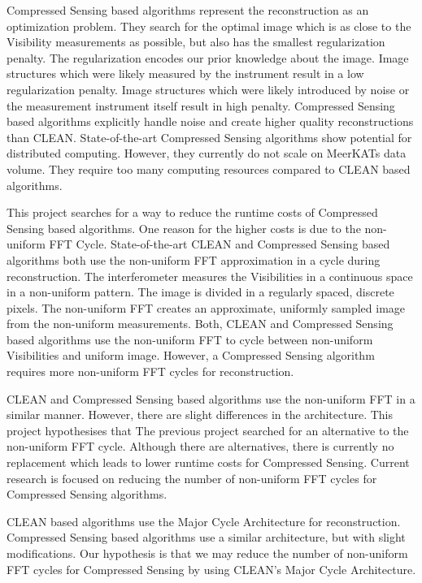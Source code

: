 Compressed Sensing based algorithms represent the reconstruction as an optimization problem. They search for the optimal image which is as close to the Visibility measurements as possible, but also has the smallest regularization penalty. The regularization encodes our prior knowledge about the image. Image structures which were likely measured by the instrument result in a low regularization penalty. Image structures which were likely introduced by noise or the measurement instrument itself result in high penalty. Compressed Sensing based algorithms explicitly handle noise and create higher quality reconstructions than CLEAN. State-of-the-art Compressed Sensing algorithms show potential for distributed computing. However, they currently do not scale on MeerKATs data volume. They require too many computing resources compared to CLEAN based algorithms.
 
This project searches for a way to reduce the runtime costs of Compressed Sensing based algorithms. One reason for the higher costs is due to the non-uniform FFT Cycle. State-of-the-art CLEAN and Compressed Sensing based algorithms both use the non-uniform FFT approximation in a cycle during reconstruction. The interferometer measures the Visibilities in a continuous space in a non-uniform pattern. The image is divided in a regularly spaced, discrete pixels. The non-uniform FFT creates an approximate, uniformly sampled image from the non-uniform measurements. Both, CLEAN and Compressed Sensing based algorithms use the non-uniform FFT to cycle between non-uniform Visibilities and uniform image. However, a Compressed Sensing algorithm requires more non-uniform FFT cycles for reconstruction. 

CLEAN and Compressed Sensing based algorithms use the non-uniform FFT in a similar manner. However, there are slight differences in the architecture. This project hypothesises that 
The previous project searched for an alternative to the non-uniform FFT cycle. Although there are alternatives, there is currently no replacement which leads to lower runtime costs for Compressed Sensing. Current research is focused on reducing the number of non-uniform FFT cycles for Compressed Sensing algorithms.

CLEAN based algorithms use the Major Cycle Architecture for reconstruction. Compressed Sensing based algorithms use a similar architecture, but with slight modifications. Our hypothesis is that we may reduce the number of non-uniform FFT cycles for Compressed Sensing by using CLEAN's Major Cycle Architecture.


